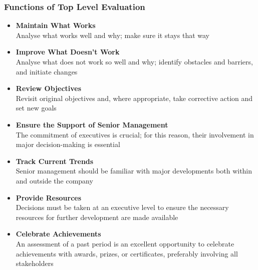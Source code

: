 \documentclass[11pt]{article}
\theoremstyle{definition}
\begin{document}
\subsubsection{Functions of Top Level Evaluation}
\begin{itemize}
	\item \textbf{Maintain What Works}\\ Analyse what works well and why; make sure it stays that way
	\item \textbf{Improve What Doesn't Work}\\ Analyse what does not work so well and why; identify obstacles and barriers, and initiate changes
	\item \textbf{Review Objectives}\\ Revisit original objectives and, where appropriate, take corrective action and set new goals
	\item \textbf{Ensure the Support of Senior Management}\\ The commitment of executives is crucial; for this reason, their involvement in major decision-making is essential
	\item \textbf{Track Current Trends}\\ Senior management should be familiar with major developments both within and outside the company
	\item \textbf{Provide Resources}\\ Decisions must be taken at an executive level to ensure the necessary resources for further development are made available
	\item \textbf{Celebrate Achievements}\\ An assessment of a past period is an excellent opportunity to celebrate achievements with awards, prizes, or certificates, preferably involving all stakeholders
\end{itemize}

\clearpage

\printbibliography
\end{document}
